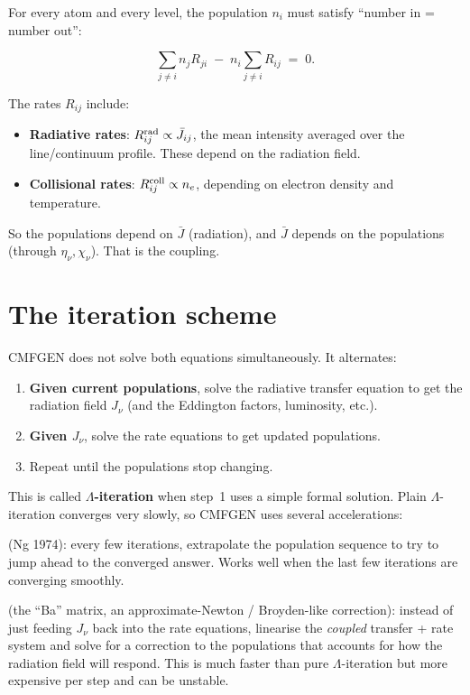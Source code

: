 \documentclass[11pt]{article}
\begin{document}
For every atom and every level, the population $n_i$ must satisfy
``number in = number out'':

\begin{equation}
  \sum_{j \neq i} n_j R_{ji} \;-\; n_i \sum_{j \neq i} R_{ij} \;=\; 0 .
\end{equation}

The rates $R_{ij}$ include:
\begin{itemize}[nosep]
  \item \textbf{Radiative rates}: $R_{ij}^{\rm rad} \propto \bar J_{ij}$,
        the mean intensity averaged over the line/continuum profile.
        These depend on the radiation field.
  \item \textbf{Collisional rates}: $R_{ij}^{\rm coll} \propto n_e$,
        depending on electron density and temperature.
\end{itemize}

So the populations depend on $\bar J$ (radiation), and $\bar J$ depends
on the populations (through $\eta_\nu, \chi_\nu$).  That is the coupling.

\section{The iteration scheme}

CMFGEN does not solve both equations simultaneously.  It alternates:

\begin{enumerate}[nosep]
  \item \textbf{Given current populations}, solve the radiative transfer
        equation to get the radiation field $J_\nu$ (and the Eddington
        factors, luminosity, etc.).
  \item \textbf{Given $J_\nu$}, solve the rate equations to get updated
        populations.
  \item Repeat until the populations stop changing.
\end{enumerate}

This is called \textbf{$\Lambda$-iteration} when step~1 uses a simple
formal solution.  Plain $\Lambda$-iteration converges very slowly, so
CMFGEN uses several accelerations:

\begin{description}[nosep]
  \item[NG acceleration] (Ng 1974): every few iterations, extrapolate
        the population sequence to try to jump ahead to the converged
        answer.  Works well when the last few iterations are converging
        smoothly.
  \item[BA iterations] (the ``Ba'' matrix, an approximate-Newton /
        Broyden-like correction): instead of just feeding $J_\nu$ back
        into the rate equations, linearise the \emph{coupled} transfer +
        rate system and solve for a correction to the populations that
        accounts for how the radiation field will respond.  This is much
        faster than pure $\Lambda$-iteration but more expensive per step
        and can be unstable.
\end{description}
\end{document}
